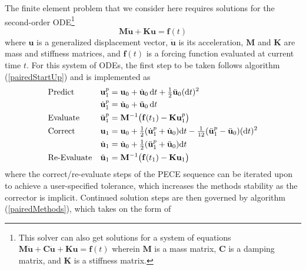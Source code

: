 The finite element problem that we consider here requires solutions for the second-order ODE\footnote{
    This solver can also get solutions for a system of equations $\mathbf{M} \ddot{\mathbf{u}} + \mathbf{C} \dot{\mathbf{u}} + \mathbf{K} \mathbf{u} = \mathbf{f}(t)$ wherein $\mathbf{M}$ is a mass matrix, $\mathbf{C}$ is a damping matrix, and $\mathbf{K}$ is a stiffness matrix.
}
\begin{displaymath}
    \mathbf{M} \ddot{\mathbf{u}} + \mathbf{K}\mathbf{u} = \mathbf{f}(t)
\end{displaymath}
where $\mathbf{u}$ is a generalized displacement vector, $\ddot{\mathbf{u}}$ is its acceleration, $\mathbf{M}$ and $\mathbf{K}$ are mass and stiffness matrices, and $\mathbf{f}(t)$ is a forcing function evaluated at current time $t$.  For this system of ODEs, the first step to be taken follows algorithm (\ref{pairedStartUp}) and is implemented as
\begin{subequations}
    \notag
    \begin{align}
    \mbox{} & \text{Predict} & 
    \mathbf{u}_1^p & = \mathbf{u}_0 + \dot{\mathbf{u}}_0 \, \mathrm{d}t +
    \tfrac{1}{2} \ddot{\mathbf{u}}_0 ( \mathrm{d}t )^2 \\
    \mbox{} & &
    \dot{\mathbf{u}}^p_1 & = \dot{\mathbf{u}}_0 + \ddot{\mathbf{u}}_0 \, \mathrm{d}t \\
    \mbox{} & \text{Evaluate} &
    \ddot{\mathbf{u}}^p_1 & = \mathbf{M}^{-1} \bigl( \mathbf{f}(t_{1} ) - 
    \mathbf{K} \mathbf{u}_1^p \bigr) \\
    \mbox{} & \text{Correct} &
    \mathbf{u}_1 & = \mathbf{u}_0 + \tfrac{1}{2} 
    ( \dot{\mathbf{u}}^p_1 + \dot{\mathbf{u}}_0 ) \mathrm{d}t -
    \tfrac{1}{12} ( \ddot{\mathbf{u}}^p_1 - \ddot{\mathbf{u}}_0 ) 
    ( \mathrm{d}t )^2 \\
    \mbox{} & &
    \dot{\mathbf{u}}_1 & = \dot{\mathbf{u}}_0 + \tfrac{1}{2}  
    ( \ddot{\mathbf{u}}_1^p + \ddot{\mathbf{u}}_0 ) \mathrm{d}t \\
    \mbox{} & \text{Re-Evaluate} &
    \ddot{\mathbf{u}}_1 & = \mathbf{M}^{-1} \bigl( \mathbf{f}(t_1 ) - 
    \mathbf{K} \mathbf{u}_1 \bigr)
    \end{align}
\end{subequations}
where the correct\slash re-evaluate steps of the PECE sequence can be iterated upon to achieve a user-specified tolerance, which increases the methods stability as the corrector is implicit.  Continued solution steps are then governed by algorithm (\ref{pairedMethods}), which takes on the form of
